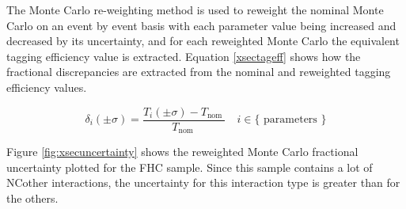 The Monte Carlo re-weighting method is used to reweight the nominal Monte Carlo on an event by event basis with each parameter value being increased and decreased by its uncertainty, and for each reweighted Monte Carlo the equivalent tagging efficiency value is extracted. Equation \eqref{xsectageff} shows how the fractional discrepancies are extracted from the nominal and reweighted tagging efficiency values.

\begin{equation}
\delta_{i}(\pm \sigma)=\frac{T_{i}(\pm \sigma)-T_{\text {nom }}}{T_{\text {nom }}} \quad i \in\{\text { parameters }\}
\label{xsectageff}
\end{equation}

Figure \ref{fig:xsecuncertainty} shows the reweighted Monte Carlo fractional uncertainty plotted for the FHC sample. Since this sample contains a lot of NCother interactions, the uncertainty for this interaction type is greater than for the others.

